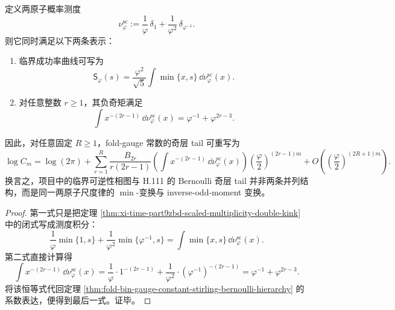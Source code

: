 \begin{theorem}\label{thm:xi-time-part9zbd-scaled-multiplicity-min-oddmoment}
定义两原子概率测度
\[
\nu_\varphi^{\mathrm{sc}}
:=
\frac1\varphi\,\delta_1+\frac1{\varphi^2}\,\delta_{\varphi^{-1}}.
\]
则它同时满足以下两条表示：
\begin{enumerate}
  \item 临界成功率曲线可写为
  \[
  \mathsf S_\varphi(s)
  =
  \frac{\varphi^2}{\sqrt5}
  \int \min\{x,s\}\,\dd\nu_\varphi^{\mathrm{sc}}(x).
  \]
  \item 对任意整数 \(r\ge 1\)，其负奇矩满足
  \[
  \int x^{-(2r-1)}\,\dd\nu_\varphi^{\mathrm{sc}}(x)
  =
  \varphi^{-1}+\varphi^{2r-3}.
  \]
\end{enumerate}
因此，对任意固定 \(R\ge 1\)，fold-gauge 常数的奇层 tail 可重写为
\[
\log C_m
=
\log(2\pi)
+
\sum_{r=1}^{R}
\frac{B_{2r}}{r(2r-1)}
\left(
\int x^{-(2r-1)}\,\dd\nu_\varphi^{\mathrm{sc}}(x)
\right)
\left(\frac{\varphi}{2}\right)^{(2r-1)m}
+
O\!\left(\left(\frac{\varphi}{2}\right)^{(2R+1)m}\right).
\]
换言之，项目中的临界可逆性相图与 H.111 的 Bernoulli 奇层 tail 并非两条并列结构，而是同一两原子尺度律的 \(\min\)-变换与 inverse-odd-moment 变换。
\end{theorem}
\begin{proof}
第一式只是把定理 \ref{thm:xi-time-part9zbd-scaled-multiplicity-double-kink} 中的闭式写成测度积分：
\[
\frac1\varphi \min\{1,s\}+\frac1{\varphi^2}\min\{\varphi^{-1},s\}
=
\int \min\{x,s\}\,\dd\nu_\varphi^{\mathrm{sc}}(x).
\]
第二式直接计算得
\[
\int x^{-(2r-1)}\,\dd\nu_\varphi^{\mathrm{sc}}(x)
=
\frac1\varphi\cdot 1^{-(2r-1)}
+
\frac1{\varphi^2}\cdot(\varphi^{-1})^{-(2r-1)}
=
\varphi^{-1}+\varphi^{2r-3}.
\]
将该恒等式代回定理 \ref{thm:fold-bin-gauge-constant-stirling-bernoulli-hierarchy} 的系数表达，便得到最后一式。证毕。
\end{proof}

